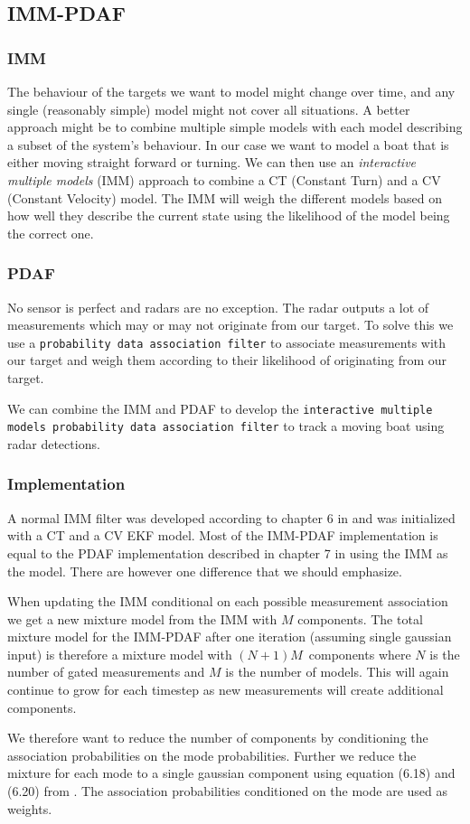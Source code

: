 \subsection{IMM-PDAF}
\subsubsection{IMM}
The behaviour of the targets we want to model might change over time, and any single (reasonably simple) model might not cover all situations. A better approach might be to combine multiple simple models with each model describing a subset of the system's behaviour. In our case we want to model a boat that is either moving straight forward or turning. We can then use an \textit{interactive multiple models} (IMM) approach to combine a CT (Constant Turn) and a CV (Constant Velocity) model. The IMM will weigh the different models based on how well they describe the current state using the likelihood of the model being the correct one.

\subsubsection{PDAF}
No sensor is perfect and radars are no exception. The radar outputs a lot of measurements which may or may not originate from our target. To solve this we use a \texttt{probability data association filter} to associate measurements with our target and weigh them according to their likelihood of originating from our target.

We can combine the IMM and PDAF to develop the \texttt{interactive multiple models probability data association filter} to track a moving boat using radar detections.

\subsubsection{Implementation}
A normal IMM filter was developed according to chapter 6 in \cite{edmund} and was initialized with a CT and a CV EKF model. Most of the IMM-PDAF implementation is equal to the PDAF implementation described in chapter 7 in \cite{edmund} using the IMM as the model. There are however one difference that we should emphasize.

When updating the IMM conditional on each possible measurement association we get a new mixture model from the IMM with $M$ components. The total mixture model for the IMM-PDAF after one iteration (assuming single gaussian input) is therefore a mixture model with $(N+1)M$ components where $N$ is the number of gated measurements and $M$ is the number of models. This will again continue to grow for each timestep as new measurements will create additional components.

We therefore want to reduce the number of components by conditioning the association probabilities on the mode probabilities. Further we reduce the mixture for each mode to a single gaussian component using equation (6.18) and (6.20) from \cite{edmund}. The association probabilities conditioned on the mode are used as weights.



